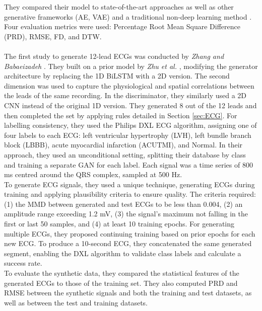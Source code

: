 They compared their model to state-of-the-art approaches \cite{zhuElectrocardiogramGenerationBidirectional2019} as well as other generative frameworks (AE, VAE) and a traditional non-deep learning method \cite{mcsharryDynamicalModelGenerating2003}. Four evaluation metrics were used: Percentage Root Mean Square Difference (PRD), RMSE, FD, and DTW.
\\ \\
The first study to generate 12-lead ECGs was conducted by \textit{Zhang and Babaeizadeh} \cite{zhangSynthesisStandard12lead2021}. They built on a prior model by \textit{Zhu et al.} \cite{zhuElectrocardiogramGenerationBidirectional2019}, modifying the generator architecture by replacing the 1D BiLSTM with a 2D version. The second dimension was used to capture the physiological and spatial correlations between the leads of the same recording. In the discriminator, they similarly used a 2D CNN instead of the original 1D version. They generated 8 out of the 12 leads and then completed the set by applying rules detailed in Section \ref{sec:ECG}. For labelling consistency, they used the Philips DXL ECG algorithm, assigning one of four labels to each ECG: left ventricular hypertrophy (LVH), left bundle branch block (LBBB), acute myocardial infarction (ACUTMI), and Normal. 
In their approach, they used an unconditional setting, splitting their database by class and training a separate GAN for each label. Each signal was a time series of 800 ms centred around the QRS complex, sampled at 500 Hz. 
\\
To generate ECG signals, they used a unique technique, generating ECGs during training and applying plausibility criteria to ensure quality. The criteria required: (1) the MMD between generated and test ECGs to be less than 0.004, (2) an amplitude range exceeding 1.2 mV, (3) the signal's maximum not falling in the first or last 50 samples, and (4) at least 10 training epochs. For generating multiple ECGs, they proposed continuing training based on prior epochs for each new ECG. To produce a 10-second ECG, they concatenated the same generated segment, enabling the DXL algorithm to validate class labels and calculate a success rate.
\\
To evaluate the synthetic data, they compared the statistical features of the generated ECGs to those of the training set. They also computed PRD and RMSE between the synthetic signals and both the training and test datasets, as well as between the test and training datasets.
\\ \\
